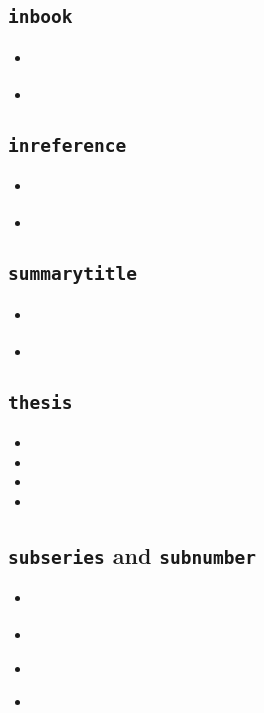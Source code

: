 \documentclass[a4paper,12pt]{scrartcl}
\newcommand*{\Typ}[1]{\texttt{\symbol{64}#1}}
\newcommand*{\Feld}[1]{\texttt{#1}}
\begin{document}
\subsection{\Typ{inbook}}
\begin{itemize}
    \item\cites{boppert:1998}%
    \item{}%
\end{itemize}


\subsection{\Typ{inreference}}
\begin{itemize}
    \item\cite{bauchhenss:et:al:1978}%
    \item{}%
\end{itemize}

\subsection{\Feld{summarytitle}}
\begin{itemize}
    \item\cite{ilinskaja:1965}%
    \item{}%
\end{itemize}

\subsection{\Typ{thesis}}
\begin{itemize}
    \item{}%
    \item{}%
    \item{}%
    \item{}%
\end{itemize}

\subsection{\Feld{subseries} and \Feld{subnumber}}
\begin{itemize}
    \item\cite{kossack:et:al:1980}%
    \item{}%
    \item\cite{harck:1980}%
    \item{}%
\end{itemize}
\end{document}
